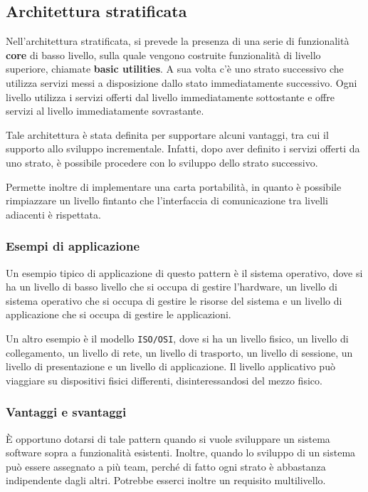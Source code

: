 \subsection{Architettura stratificata}
Nell'architettura stratificata, si prevede la presenza di una serie di funzionalità \textbf{core}
di basso livello, sulla quale vengono costruite funzionalità di livello superiore, chiamate 
\textbf{basic utilities}. A sua volta c'è uno strato successivo che utilizza servizi messi 
a disposizione dallo stato immediatamente successivo. Ogni livello utilizza i servizi offerti
dal livello immediatamente sottostante e offre servizi al livello immediatamente sovrastante.

Tale architettura è stata definita per supportare alcuni vantaggi, tra cui il supporto
allo sviluppo incrementale. Infatti, dopo aver definito i servizi offerti da uno strato,
è possibile procedere con lo sviluppo dello strato successivo.

Permette inoltre di implementare una carta portabilità, in quanto è possibile rimpiazzare
un livello fintanto che l'interfaccia di comunicazione tra livelli adiacenti è rispettata.
\subsubsection{Esempi di applicazione}
Un esempio tipico di applicazione di questo pattern è il sistema operativo, dove
si ha un livello di basso livello che si occupa di gestire l'hardware, un livello
di sistema operativo che si occupa di gestire le risorse del sistema e un livello
di applicazione che si occupa di gestire le applicazioni.

Un altro esempio è il modello \texttt{ISO/OSI}, dove si ha un livello fisico, un livello
di collegamento, un livello di rete, un livello di trasporto, un livello di sessione, un
livello di presentazione e un livello di applicazione. Il livello applicativo può viaggiare 
su dispositivi fisici differenti, disinteressandosi del mezzo fisico.


\subsubsection{Vantaggi e svantaggi}
È opportuno dotarsi di tale pattern quando si vuole sviluppare un sistema software sopra 
a funzionalità esistenti. Inoltre, quando lo sviluppo di un sistema può essere assegnato  
a più team, perché di fatto ogni strato è abbastanza indipendente dagli altri. Potrebbe 
esserci inoltre un requisito multilivello.

